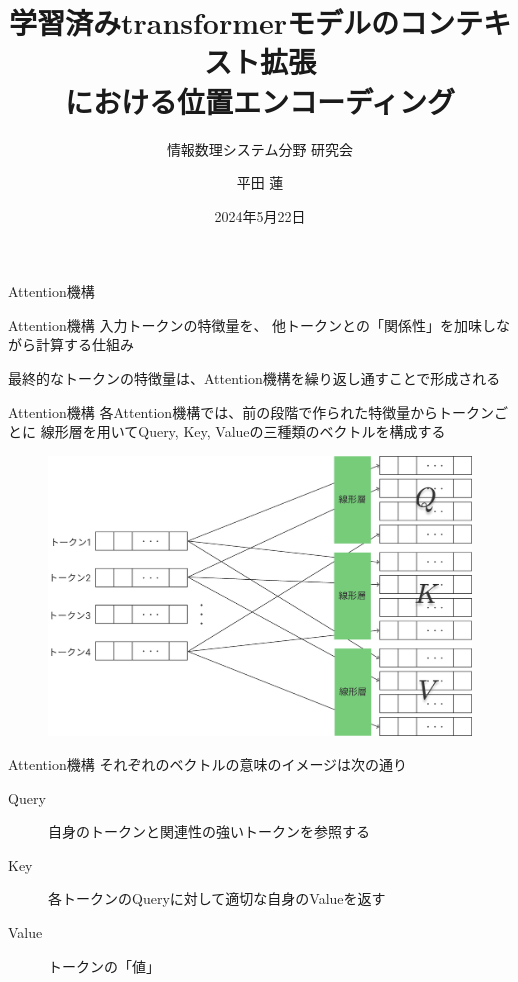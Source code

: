 \documentclass[dvipdfm]{beamer}
\title[研究会]{
    学習済みtransformerモデルのコンテキスト拡張 \\
    における位置エンコーディング
}
\subtitle[]{情報数理システム分野 研究会}
\author[平田 蓮]{平田 蓮}
\date{2024年5月22日}
\begin{document}
    \begin{frame}
        \titlepage
    \end{frame}
    \begin{frame}{Attention機構}
        \begin{block}{Attention機構}
            入力トークンの特徴量を、
            他トークンとの「関係性」を加味しながら計算する仕組み

            最終的なトークンの特徴量は、Attention機構を繰り返し通すことで形成される
        \end{block}
    \end{frame}
    \begin{frame}{Attention機構}
        各Attention機構では、前の段階で作られた特徴量からトークンごとに
        線形層を用いてQuery, Key, Valueの三種類のベクトルを構成する

        \begin{figure}
            \centering
            \includegraphics[width=.6\hsize]{qkv.pdf}
        \end{figure}
    \end{frame}
    \begin{frame}{Attention機構}
        それぞれのベクトルの意味のイメージは次の通り
        \begin{block}{}
            \begin{description}
                \item[Query] 自身のトークンと関連性の強いトークンを参照する
                \item[Key] 各トークンのQueryに対して適切な自身のValueを返す
                \item[Value] トークンの「値」
            \end{description}
        \end{block}
    \end{frame}
\end{document}
